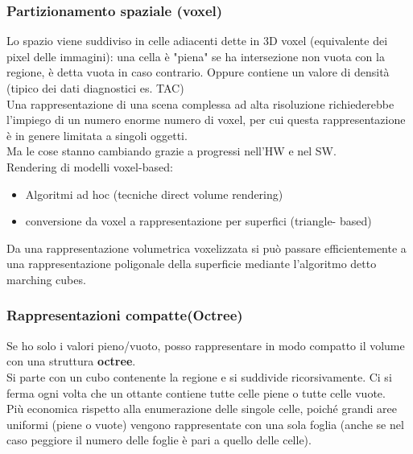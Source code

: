 \documentclass[a4paper, 10pt]{article}
\begin{document}
		\subsubsection{Partizionamento spaziale (voxel)}
			Lo spazio viene suddiviso in celle adiacenti dette in 3D voxel
			(equivalente dei pixel delle immagini): una cella è "piena" se
			ha intersezione non vuota con la regione, è detta vuota in
			caso contrario. Oppure contiene un valore di densità (tipico
			dei dati diagnostici es. TAC)\\
			Una rappresentazione di una scena complessa ad alta
			risoluzione richiederebbe l’impiego di un numero enorme
			numero di voxel, per cui questa rappresentazione è in genere
			limitata a singoli oggetti.\\
			Ma le cose stanno cambiando grazie a
			progressi nell'HW e nel SW.\\
			Rendering di modelli voxel-based:
			\begin{itemize}
				\item Algoritmi ad hoc (tecniche direct volume rendering)
				\item conversione da voxel a rappresentazione per superfici (triangle-
				based)
			\end{itemize}
			Da una rappresentazione volumetrica voxelizzata si può
			passare efficientemente a una rappresentazione poligonale
			della superficie mediante l’algoritmo detto marching cubes.
		
		\subsubsection{Rappresentazioni compatte(Octree)}
			Se ho solo i valori pieno/vuoto, posso rappresentare in modo
			compatto il volume con una struttura \textbf{octree}.\\
			Si parte con un cubo contenente la regione e si suddivide
			ricorsivamente. Ci si ferma ogni volta che un ottante contiene
			tutte celle piene o tutte celle vuote.\\
			Più economica rispetto alla enumerazione delle singole celle,
			poiché grandi aree uniformi (piene o vuote) vengono
			rappresentate con una sola foglia (anche se nel caso peggiore
			il numero delle foglie è pari a quello delle celle).
\end{document}
